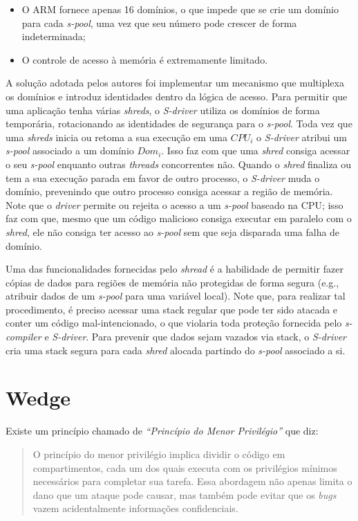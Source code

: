 \begin{itemize}
  \item O ARM fornece apenas 16 domínios, o que impede que se crie um domínio
        para cada \emph{s-pool}, uma vez que seu número pode crescer de forma
        indeterminada;
  \item O controle de acesso à memória é extremamente limitado.
\end{itemize}

A solução adotada pelos autores foi implementar um mecanismo que multiplexa os
domínios e introduz identidades dentro da lógica de acesso. Para permitir que
uma aplicação tenha várias \emph{shreds}, o \emph{S-driver} utiliza os domínios
de forma temporária, rotacionando as identidades de segurança para o
\emph{s-pool}. Toda vez que uma \emph{shreds} inicia ou retoma a sua execução
em uma $CPU_i$ o \emph{S-driver} atribui um \emph{s-pool} associado a um
domínio $Dom_i$. Isso faz com que uma \emph{shred} consiga acessar o seu
\emph{s-pool} enquanto outras \emph{threads} concorrentes não. Quando o
\emph{shred} finaliza ou tem a sua execução parada em favor de outro
processo, o \emph{S-driver} muda o domínio, prevenindo que outro processo
consiga acessar a região de memória. Note que o \emph{driver} permite ou
rejeita o acesso a um \emph{s-pool} baseado na CPU; isso faz com que, mesmo que
um código malicioso consiga executar em paralelo com o \emph{shred}, ele não
consiga ter acesso ao \emph{s-pool} sem que seja disparada uma falha de
domínio.

Uma das funcionalidades fornecidas pelo \emph{shread} é a habilidade de
permitir fazer cópias de dados para regiões de memória não protegidas de forma segura
(e.g., atribuir dados de um \emph{s-pool} para uma variável local). Note que,
para realizar tal procedimento, é preciso acessar uma stack regular que pode ter
sido atacada e conter um código mal-intencionado, o que violaria toda proteção
fornecida pelo \emph{s-compiler} e \emph{S-driver}. Para prevenir que dados
sejam vazados via stack, o \emph{S-driver} cria uma stack segura para cada
\emph{shred} alocada partindo do \emph{s-pool} associado a si.

\section{Wedge}

Existe um princípio chamado de \emph{``Princípio do Menor Privilégio''} que diz:

\begin{quote}
O princípio do menor privilégio implica dividir o código em compartimentos,
cada um dos quais executa com os privilégios mínimos necessários para completar
sua tarefa. Essa abordagem não apenas limita o dano que um ataque pode causar,
mas também pode evitar que os \emph{bugs} vazem acidentalmente informações
confidenciais.
\end{quote}

